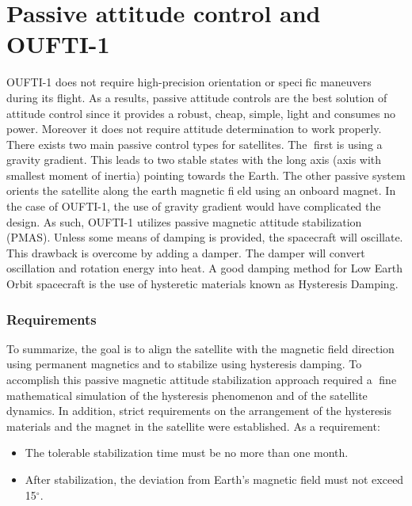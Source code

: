 \documentclass[12pt]{article}
\begin{document}
\section{Passive attitude control and OUFTI-1}
OUFTI-1 does not require high-precision orientation or specific maneuvers during its flight. As a results, passive attitude controls are the best solution of attitude control since it provides a robust, cheap, simple, light and consumes no power. Moreover it does not require attitude determination to work properly. 
\newline \newline
There exists two main passive control types for satellites. The first is using a  gravity gradient. This leads to two stable states with the long axis (axis with smallest moment of inertia) pointing towards the Earth. The other passive system orients the satellite along the earth magnetic field using an onboard magnet. In the case of OUFTI-1, the use of gravity gradient would have complicated the design. As such, OUFTI-1 utilizes passive magnetic attitude stabilization (PMAS).
\newline \newline
Unless some means of damping is provided, the spacecraft will oscillate. This drawback is overcome by adding a damper. The damper will convert oscillation and rotation energy into heat. A good damping method for Low Earth Orbit spacecraft is the use of hysteretic materials known as Hysteresis Damping.
\subsubsection{Requirements}
To summarize, the goal is to align the satellite with the magnetic field direction using permanent magnetics and to stabilize using hysteresis damping. To accomplish this passive magnetic attitude stabilization approach required a fine mathematical simulation of the hysteresis phenomenon and of the satellite dynamics. In addition, strict requirements on the arrangement of the hysteresis materials and the magnet in the satellite were established. As a requirement:
\begin{itemize}
\item The tolerable stabilization time must be no more than one month.
\item After stabilization, the deviation from Earth's magnetic field must not exceed 15$^{\circ}$.
\end{itemize}
\end{document}
